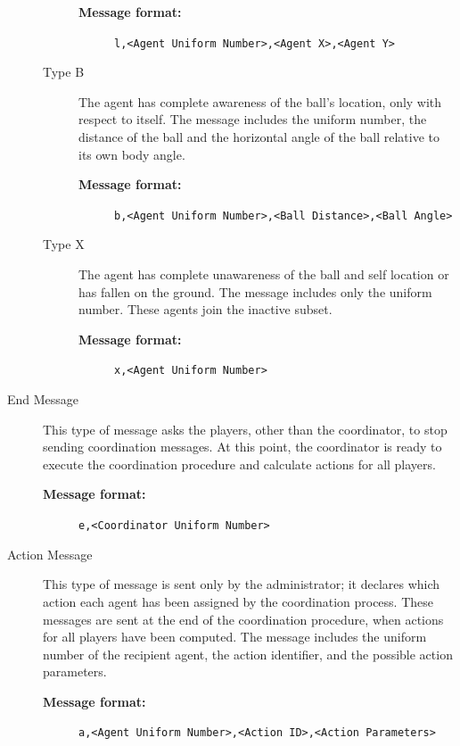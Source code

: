 \begin{description}
\begin{description}
\begin{description}
  \item[{\bf Message format:}]
  \texttt{l,<Agent Uniform Number>,<Agent X>,<Agent Y>}
\end{description}

\item[Type B] The agent has complete awareness of the ball's location, only with respect to itself. The message includes the uniform number, the distance of the ball and the horizontal angle of the ball relative to its own body angle.

\begin{description}
  \item[{\bf Message format:}]
\texttt{b,<Agent Uniform Number>,<Ball Distance>,<Ball Angle>}
\end{description}

\item[Type X] The agent has complete unawareness of the ball and self location or has fallen on the ground. The message includes only the uniform number. These agents join the inactive subset.

\begin{description}
 \item[{\bf Message format:}]
 \texttt{x,<Agent Uniform Number>}
\end{description}

\end{description}
\item[End Message]
This type of message asks the players, other than the coordinator, to stop sending coordination messages. At this point, the coordinator is ready to execute the coordination procedure and calculate actions for all players.
\begin{description}
  \item[{\bf Message format:}] 
  \texttt{e,<Coordinator Uniform Number>}
\end{description}
\item[Action Message]
This type of message is sent only by the administrator; it declares which action each agent has been assigned by the coordination process. These messages are sent at the end of the coordination procedure, when actions for all players have been computed. The message includes the uniform number of the recipient agent, the action identifier, and the possible action parameters. 
\begin{description}
  \item[{\bf Message format:}]
  \texttt{a,<Agent Uniform Number>,<Action ID>,<Action Parameters>}
\end{description}

\end{description}

